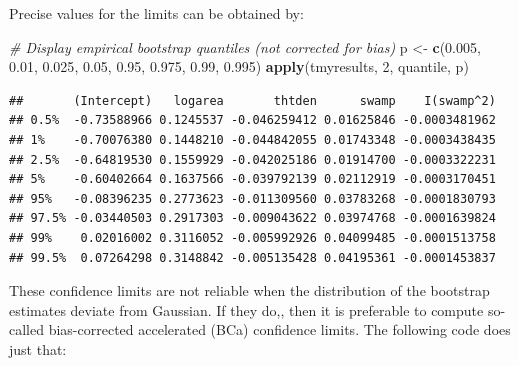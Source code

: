 \documentclass[
  12pt,
]{book}
\newenvironment{Shaded}{\begin{snugshade}}{\end{snugshade}}
\newcommand{\CommentTok}[1]{\textcolor[rgb]{0.56,0.35,0.01}{\textit{#1}}}
\newcommand{\DecValTok}[1]{\textcolor[rgb]{0.00,0.00,0.81}{#1}}
\newcommand{\FloatTok}[1]{\textcolor[rgb]{0.00,0.00,0.81}{#1}}
\newcommand{\KeywordTok}[1]{\textcolor[rgb]{0.13,0.29,0.53}{\textbf{#1}}}
\newcommand{\NormalTok}[1]{#1}
\newcommand{\StringTok}[1]{\textcolor[rgb]{0.31,0.60,0.02}{#1}}
\begin{document}
Precise values for the limits can be obtained by:

\begin{Shaded}
\begin{Highlighting}[]
\CommentTok{\# Display empirical bootstrap quantiles (not corrected for bias)}
\NormalTok{p \textless{}{-}}\StringTok{ }\KeywordTok{c}\NormalTok{(}\FloatTok{0.005}\NormalTok{, }\FloatTok{0.01}\NormalTok{, }\FloatTok{0.025}\NormalTok{, }\FloatTok{0.05}\NormalTok{, }\FloatTok{0.95}\NormalTok{, }\FloatTok{0.975}\NormalTok{, }\FloatTok{0.99}\NormalTok{, }\FloatTok{0.995}\NormalTok{)}
\KeywordTok{apply}\NormalTok{(tmyresults, }\DecValTok{2}\NormalTok{, quantile, p)}
\end{Highlighting}
\end{Shaded}

\begin{verbatim}
##       (Intercept)   logarea       thtden      swamp    I(swamp^2)
## 0.5%  -0.73588966 0.1245537 -0.046259412 0.01625846 -0.0003481962
## 1%    -0.70076380 0.1448210 -0.044842055 0.01743348 -0.0003438435
## 2.5%  -0.64819530 0.1559929 -0.042025186 0.01914700 -0.0003322231
## 5%    -0.60402664 0.1637566 -0.039792139 0.02112919 -0.0003170451
## 95%   -0.08396235 0.2773623 -0.011309560 0.03783268 -0.0001830793
## 97.5% -0.03440503 0.2917303 -0.009043622 0.03974768 -0.0001639824
## 99%    0.02016002 0.3116052 -0.005992926 0.04099485 -0.0001513758
## 99.5%  0.07264298 0.3148842 -0.005135428 0.04195361 -0.0001453837
\end{verbatim}

These confidence limits are not reliable when the distribution of the bootstrap estimates deviate from Gaussian. If they do,, then it is preferable to compute so-called bias-corrected accelerated (BCa) confidence limits. The following code does just that:
\end{document}
